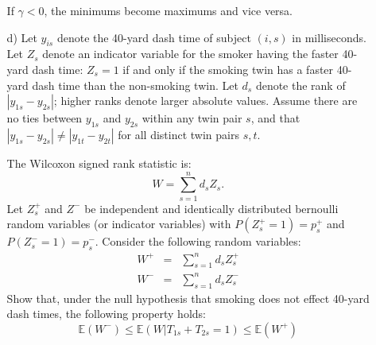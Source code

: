 \documentclass{article}
\newcommand{\E}[0]{\mathbb{E}}
\begin{document}
\begin{itemize}
\begin{itemize}
            If $\gamma < 0$, the minimums become maximums and vice versa.
        \item[d)]
          Let $y_{is}$ denote the 40-yard dash time of subject $(i,s)$ in milliseconds.
          Let $Z_s$ denote an indicator variable for the smoker having the faster 40-yard dash time:
          $Z_s = 1$ if and only if the smoking twin 
          has a faster 40-yard dash time than the non-smoking twin.
          Let $d_s$ denote the rank of $|y_{1s} - y_{2s}|$; 
          higher ranks denote larger absolute values.
          Assume there are no ties between $y_{1s}$ and $y_{2s}$ within any 
          twin pair $s$,
          and that $|y_{1s} - y_{2s}| \neq |y_{1t} - y_{2t}|$ for all distinct twin pairs $s,t$.
          
          The Wilcoxon signed rank statistic is:
          $$
            W = \sum_{s=1}^n d_sZ_s.
          $$
          Let $Z^+_s$ and $Z^-$ be independent and identically distributed 
          bernoulli random variables (or indicator variables) with $P(Z^+_s = 1) = p^+_s$
          and $P(Z^-_s = 1) = p^-_s$.
          Consider the following random variables:
          \begin{eqnarray*}
            W^+ &=& \sum_{s=1}^n d_s Z^+_s \\
            W^- & = & \sum_{s=1}^n d_sZ^-_s
          \end{eqnarray*}
          Show that, under the null hypothesis that smoking does not effect 40-yard dash times, 
          the following property holds:
          $$
           \E(W^-)\leq  \E(W| T_{1s} + T_{2s} =1) \leq \E(W^+) 
          $$
          

\end{itemize}
\end{itemize}
\end{document}
